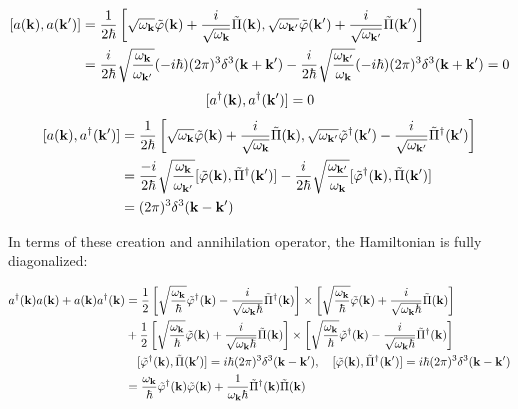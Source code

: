 \[\begin{split}
[a({\bf k}),a({\bf k'})] &= \frac{1}{2\hbar} \left[\sqrt{\omega_{\bf k}}\tilde\varphi({\bf k}) + \frac{i}{\sqrt{\omega_{\bf k}}}\tilde\Pi({\bf k}),\sqrt{\omega_{\bf k'}}\tilde\varphi({\bf k'}) + \frac{i}{\sqrt{\omega_{\bf k'}}}\tilde\Pi({\bf k'}) \right]\\
&=\frac{i}{2\hbar}\sqrt{\frac{{\omega_{\bf k}}}{{\omega_{\bf k'}}}}(-i\hbar)(2\pi)^3\delta^3({\bf k+k'}) - \frac{i}{2\hbar}\sqrt{\frac{{\omega_{\bf k'}}}{{\omega_{\bf k}}}}(-i\hbar)(2\pi)^3\delta^3({\bf k+k'}) = 0
\end{split}\]
\[[a^\dagger({\bf k}),a^\dagger({\bf k'})] = 0 \]
\[\begin{split}
[a({\bf k}),a^\dagger({\bf k'})]&= \frac{1}{2\hbar} \left[\sqrt{\omega_{\bf k}}\tilde\varphi({\bf k}) + \frac{i}{\sqrt{\omega_{\bf k}}}\tilde\Pi({\bf k}),\sqrt{\omega_{\bf k'}}\tilde\varphi^\dagger({\bf k'}) - \frac{i}{\sqrt{\omega_{\bf k'}}}\tilde\Pi^\dagger({\bf k'}) \right]\\
&=\frac{-i}{2\hbar}\sqrt{\frac{{\omega_{\bf k}}}{{\omega_{\bf k'}}}}[\tilde{\varphi}({\bf k}),\tilde{\Pi}^\dagger({\bf k'})] - \frac{i}{2\hbar}\sqrt{\frac{{\omega_{\bf k'}}}{{\omega_{\bf k}}}}[\tilde{\varphi}^\dagger({\bf k}),\tilde{\Pi}({\bf k'})]\\
&=(2\pi)^3\delta^3({\bf k-k'})
\end{split} \]

In terms of these creation and annihilation operator, the Hamiltonian is fully diagonalized:

\[\begin{split}
a^\dagger({\bf k})a({\bf k}) + a({\bf k})a^\dagger({\bf k})
&= \frac{1}{2}\left[\sqrt{\frac{\omega_{\bf k}}{\hbar}}\tilde\varphi^\dagger({\bf k}) - \frac{i}{\sqrt{\omega_{\bf k}\hbar}}\tilde\Pi^\dagger({\bf k})\right]\times\left[\sqrt{\frac{\omega_{\bf k}}{\hbar}}\tilde\varphi({\bf k}) + \frac{i}{\sqrt{\omega_{\bf k}\hbar}}\tilde\Pi({\bf k})\right]\\
& +\frac{1}{2}\left[\sqrt{\frac{\omega_{\bf k}}{\hbar}}\tilde\varphi({\bf k}) + \frac{i}{\sqrt{\omega_{\bf k}\hbar}}\tilde\Pi({\bf k})\right]\times\left[\sqrt{\frac{\omega_{\bf k}}{\hbar}}\tilde\varphi^\dagger({\bf k}) - \frac{i}{\sqrt{\omega_{\bf k}\hbar}}\tilde\Pi^\dagger({\bf k})\right]\\
&\quad [\tilde\varphi^\dagger({\bf k}),\tilde\Pi({\bf k'})] = i\hbar(2\pi)^3\delta^3({\bf k-k'}),\quad [\tilde\varphi({\bf k}),\tilde\Pi^\dagger({\bf k'})] = i\hbar(2\pi)^3\delta^3({\bf k-k'})\\
&=\frac{\omega_{\bf k}}{\hbar}\tilde\varphi^\dagger({\bf k})\tilde\varphi({\bf k}) + \frac{1}{\omega_{\bf k}\hbar}\tilde\Pi^\dagger({\bf k})\tilde\Pi({\bf k})
\end{split}\]

